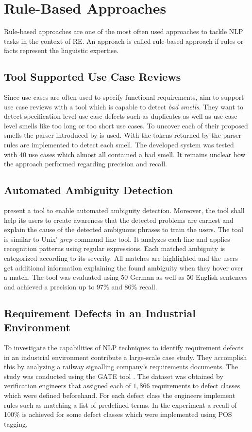 \section{Rule-Based Approaches}
\label{chp:related_research:sec:rule_based approaches}
Rule-based approaches are one of the most often used approaches to tackle \ac{NLP} tasks in the context of \ac{RE}.
An approach is called rule-based approach if rules or facts represent the linguistic expertise. \parencite{Zhao:2020}

\subsection{Tool Supported Use Case Reviews}
Since use cases are often used to specify functional requirements, \textcite{Ciemniewska:2007} aim to support use case reviews with a tool which is capable to detect \textit{bad smells}.
They want to detect specification level use case defects such as duplicates as well as use case level smells like too long or too short use cases.
To uncover each of their proposed smells the parser introduced by \textcite{Klein:2002} is used.
With the tokens returned by the parser rules are implemented to detect each smell.
The developed system was tested with 40 use cases which almost all contained a bad smell.
It remains unclear how the approach performed regarding precision and recall.

\subsection{Automated Ambiguity Detection}
\textcite{Gleich:2010} present a tool to enable automated ambiguity detection.
Moreover, the tool shall help its users to create awareness that the detected problems are earnest and explain the cause of the detected ambiguous phrases to train the users.
The tool is similar to Unix' \textit{grep} command line tool.
It analyzes each line and applies recognition patterns using regular expressions.
Each matched ambiguity is categorized according to its severity.
All matches are highlighted and the users get additional information explaining the found ambiguity when they hover over a match.
The tool was evaluated using 50 German as well as 50 English sentences and achieved a precision up to 97\% and 86\% recall.

\subsection{Requirement Defects in an Industrial Environment}
To investigate the capabilities of \ac{NLP} techniques to identify requirement defects in an industrial environment \textcite{Rosadini:2017} contribute a large-scale case study.
They accomplish this by analyzing a railway signalling company's requirements documents.
The study was conducted using the \ac{GATE} tool \parencite{Cunningham:2002}.
The dataset was obtained by verification engineers that assigned each of $1,866$ requirements to defect classes which were defined beforehand.
For each defect class the engineers implement rules such as matching a list of predefined terms.
In the experiment a recall of 100\% is achieved for some defect classes which were implemented using \ac{POS} tagging.

